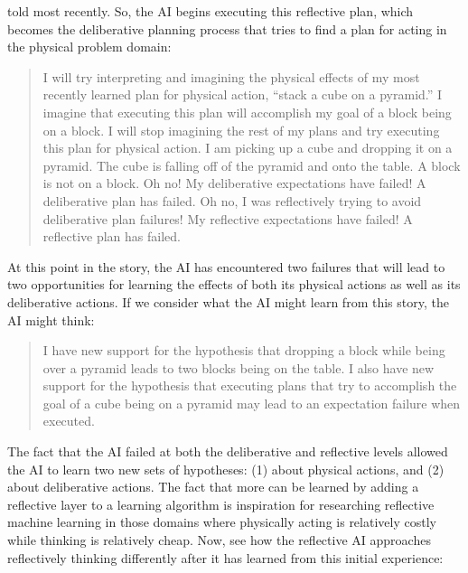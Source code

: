 told most recently.  So, the AI begins executing this reflective plan,
which becomes the deliberative planning process that tries to find a
plan for acting in the physical problem domain:
\begin{quote}
  I will try interpreting and imagining the physical effects of my
  most recently learned plan for physical action, ``stack a cube on a
  pyramid.''  I imagine that executing this plan will accomplish my
  goal of a block being on a block.  I will stop imagining the rest of
  my plans and try executing this plan for physical action.  I am
  picking up a cube and dropping it on a pyramid.  The cube is falling
  off of the pyramid and onto the table.  A block is not on a block.
  Oh no!  My deliberative expectations have failed!  A deliberative
  plan has failed.  Oh no, I was reflectively trying to avoid
  deliberative plan failures!  My reflective expectations have failed!
  A reflective plan has failed.
\end{quote}
At this point in the story, the AI has encountered two failures that
will lead to two opportunities for learning the effects of both its
physical actions as well as its deliberative actions.  If we consider
what the AI might learn from this story, the AI might think:
\begin{quote}
  I have new support for the hypothesis that dropping a block while
  being over a pyramid leads to two blocks being on the table.  I also
  have new support for the hypothesis that executing plans that try to
  accomplish the goal of a cube being on a pyramid may lead to an
  expectation failure when executed.
\end{quote}
The fact that the AI failed at both the deliberative and reflective
levels allowed the AI to learn two new sets of hypotheses: (1) about
physical actions, and (2) about deliberative actions.  The fact that
more can be learned by adding a reflective layer to a learning
algorithm is inspiration for researching reflective machine learning
in those domains where physically acting is relatively costly while
thinking is relatively cheap.  Now, see how the reflective AI
approaches reflectively thinking differently after it has learned from
this initial experience:
